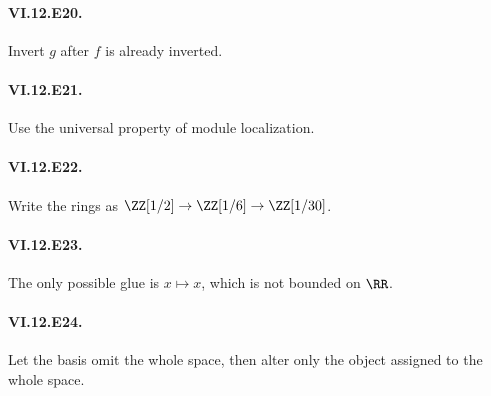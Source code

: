 \paragraph{VI.12.E20.} Invert $g$ after $f$ is already inverted.

\paragraph{VI.12.E21.} Use the universal property of module localization.

\paragraph{VI.12.E22.} Write the rings as $\ZZ[1/2]\to\ZZ[1/6]\to\ZZ[1/30]$.

\paragraph{VI.12.E23.} The only possible glue is $x\mapsto x$, which is not bounded on $\RR$.

\paragraph{VI.12.E24.} Let the basis omit the whole space, then alter only the object assigned to the whole space.
